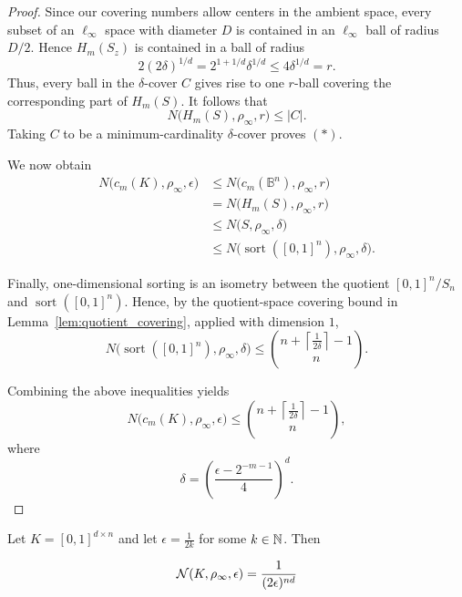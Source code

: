 \begin{proof}
Since our covering numbers allow centers in the ambient space, every
subset of an $\ell_\infty$ space with diameter $D$ is contained in an
$\ell_\infty$ ball of radius $D/2$. Hence $H_m(S_z)$ is contained in
a ball of radius
\[
    2(2\delta)^{1/d}
    =
    2^{1+1/d}\delta^{1/d}
    \leq
    4\delta^{1/d}
    =
    r.
\]
Thus, every ball in the $\delta$-cover $C$ gives rise to one
$r$-ball covering the corresponding part of $H_m(S)$. It follows that
\[
    N\bigl(H_m(S),\rho_\infty,r\bigr)
    \leq |C|.
\]
Taking $C$ to be a minimum-cardinality $\delta$-cover proves $(*)$.

We now obtain
\[
\begin{aligned}
    N\bigl(c_m(K),\rho_\infty,\epsilon\bigr)
    &\leq
    N\bigl(c_m(\mathbb{B}^n),\rho_\infty,r\bigr)
    \\
    &=
    N\bigl(H_m(S),\rho_\infty,r\bigr)
    \\
    &\leq
    N\bigl(S,\rho_\infty,\delta\bigr)
    \\
    &\leq
    N\bigl(\operatorname{sort}([0,1]^n),\rho_\infty,\delta\bigr).
\end{aligned}
\]

Finally, one-dimensional sorting is an isometry between the quotient
$[0,1]^n/S_n$ and $\operatorname{sort}([0,1]^n)$. Hence, by the
quotient-space covering bound in Lemma~\ref{lem:quotient_covering},
applied with dimension $1$,
\[
    N\bigl(\operatorname{sort}([0,1]^n),\rho_\infty,\delta\bigr)
    \leq
    \binom{
        n+\left\lceil \frac{1}{2\delta}\right\rceil-1
    }{n}.
\]

Combining the above inequalities yields
\[
    N\bigl(c_m(K),\rho_\infty,\epsilon\bigr)
    \leq
    \binom{
        n+\left\lceil \frac{1}{2\delta}\right\rceil-1
    }{n},
\]
where
\[
    \delta
    =
    \left(
        \frac{\epsilon-2^{-m-1}}{4}
    \right)^d.
\]
\end{proof}
\begin{lemma}
\label{covering_cube}
Let $K=[0,1]^{d\times n}$ and let $\epsilon=\frac{1}{2k}$ for some $k\in\mathbb{N}$. Then

$$
\mathcal{N}(K,\rho_\infty,\epsilon)=\frac{1}{(2\epsilon)^{nd}}
$$

\end{lemma}

